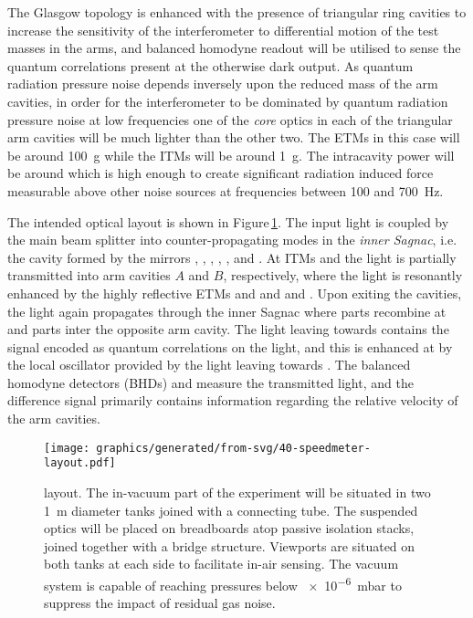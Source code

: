 The Glasgow \SSMEXPT{} topology is enhanced with the presence of triangular ring cavities to increase the sensitivity of the interferometer to differential motion of the test masses in the arms, and balanced homodyne readout will be utilised to sense the quantum correlations present at the otherwise dark output. As quantum radiation pressure noise depends inversely upon the reduced mass of the arm cavities, in order for the interferometer to be dominated by quantum radiation pressure noise at low frequencies one of the \emph{core} optics in each of the triangular arm cavities will be much lighter than the other two. The \glspl{ETM} in this case will be around \SI{100}{\gram} while the \glspl{ITM} will be around \SI{1}{\gram}. The intracavity power will be around  which is high enough to create significant radiation induced force measurable above other noise sources at frequencies between \num{100} and \SI{700}{\hertz}.

The intended optical layout is shown in Figure\,\ref{fig:ssm-layout}. The input light is coupled by the main beam splitter \MSIX{} into counter-propagating modes in the \emph{inner Sagnac}, i.e. the cavity formed by the mirrors \MSIX{}, \MSEVEN{}, \MONEA{}, \MTEN{}, \MNINE{}, \MEIGHT{} and \MONEB{}. At \glspl{ITM} \MONEA{} and \MONEB{} the light is partially transmitted into arm cavities $A$ and $B$, respectively, where the light is resonantly enhanced by the highly reflective \glspl{ETM} \MTWOA{} and \MTHREEA{} and \MTWOB{} and \MTHREEB{}. Upon exiting the cavities, the light again propagates through the inner Sagnac where parts recombine at \MSIX{} and parts inter the opposite arm cavity. The light leaving \MSIX{} towards \MFOURTEEN{} contains the signal encoded as quantum correlations on the light, and this is enhanced at \MSIXTEEN{} by the local oscillator provided by the light leaving \MSIX{} towards \MTWELVE{}. The balanced homodyne detectors (\glspl{BHD}) \HDA{} and \HDB{} measure the transmitted light, and the difference signal primarily contains information regarding the relative velocity of the arm cavities.

\begin{figure}
  \centering
  \texttt{[image: graphics/generated/from-svg/40-speedmeter-layout.pdf]}
  \caption[\SSMEXPT{} layout]{\label{fig:ssm-layout}\SSMEXPT{} layout. The in-vacuum part of the experiment will be situated in two \SI{1}{\meter} diameter tanks joined with a connecting tube. The suspended optics will be placed on breadboards atop passive isolation stacks, joined together with a bridge structure. Viewports are situated on both tanks at each side to facilitate in-air sensing. The vacuum system is capable of reaching pressures below \SI{e-6}{\milli\bar} to suppress the impact of residual gas noise.}
\end{figure}

